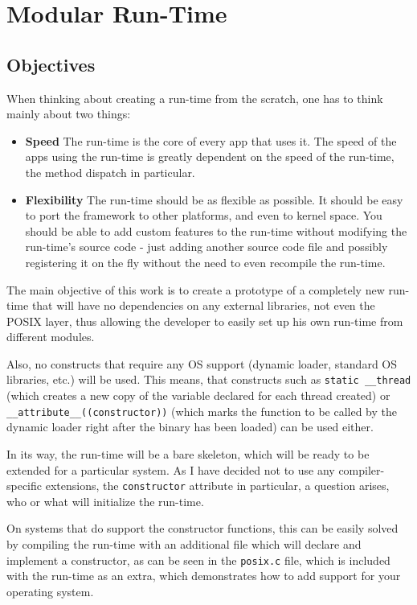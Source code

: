 \chapter{Modular Run-Time}

\section{Objectives}

When thinking about creating a run-time from the scratch, one has to think mainly about two things:

\begin{itemize}
  \item{\bf{Speed}} The run-time is the core of every app that uses it. The speed of the apps using the run-time is greatly dependent on the speed of the run-time, the method dispatch in particular.
  \item{\bf{Flexibility}} The run-time should be as flexible as possible. It should be easy to port the framework to other platforms, and even to kernel space. You should be able to add custom features to the run-time without modifying the run-time's source code - just adding another source code file and possibly registering it on the fly without the need to even recompile the run-time.
\end{itemize}

The main objective of this work is to create a prototype of a completely new run-time that will have no dependencies on any external libraries, not even the POSIX layer, thus allowing the developer to easily set up his own run-time from different modules.

Also, no constructs that require any OS support (dynamic loader, standard OS libraries, etc.) will be used. This means, that constructs such as \verb=static __thread= (which creates a new copy of the variable declared for each thread created) or \newline{} \verb=__attribute__((constructor))= (which marks the function to be called by the dynamic loader right after the binary has been loaded) can be used either.

In its way, the run-time will be a bare skeleton, which will be ready to be extended for a particular system. As I have decided not to use any compiler-specific extensions, the \verb=constructor= attribute in particular, a question arises, who or what will initialize the run-time.

On systems that do support the constructor functions, this can be easily solved by compiling the run-time with an additional file which will declare and implement a constructor, as can be seen in the \verb=posix.c= file, which is included with the run-time as an extra, which demonstrates how to add support for your operating system.

